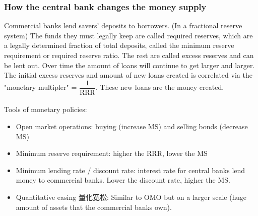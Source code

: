 \documentclass[a4paper,12pt]{article}
\begin{document}
\subsubsection*{How the central bank changes the money supply}
Commercial banks lend savers' deposits to borrowers. (In a fractional reserve system) The funds they must legally keep are called required reserves, which are a legally determined fraction of total deposits, called the minimum reserve requirement or required reserve ratio. The rest are called excess reserves and can be lent out. Over time the amount of loans will continue to get larger and larger. The initial excess reserves and amount of new loans created is correlated via the "monetary multipler" = $\dfrac{1}{\text{RRR}}$. These new loans are the money created.\\\\
Tools of monetary policies:
\begin{itemize}
  \item Open market operations: buying (increase MS) and selling bonds (decrease MS)
  \item Minimum reserve requirement: higher the RRR, lower the MS
  \item Minimum lending rate / discount rate: interest rate for central banks lend money to commercial banks. Lower the discount rate, higher the MS.
  \item Quantitative easing 量化宽松: Similar to OMO but on a larger scale (huge amount of assets that the commercial banks own). 
\end{itemize}
\end{document}
